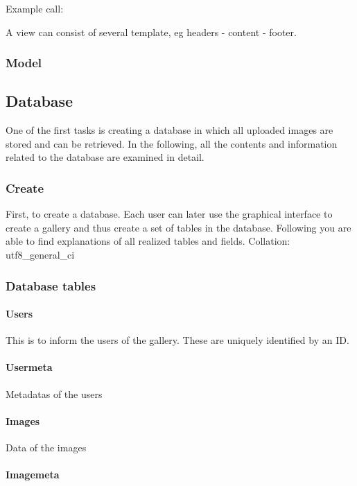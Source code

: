 \documentclass[a4paper,12pt,oneside]{article} %
\begin{document}
Example call:

A view can consist of several template, eg headers - content - footer.


\subsubsection*{Model}


\subsection{Database }

One of the first tasks is creating a database in which all uploaded
images are stored and can be retrieved. In the following, all the
contents and information related to the database are examined in detail.


\subsubsection{Create}

First, to create a database.  Each user can later use the graphical
interface to create a gallery and thus create a set of tables in the
database. Following you are able to find explanations of all realized
tables and fields. Collation: utf8\_general\_ci


\subsubsection{Database tables}


\paragraph*{Users}

This is to inform the users of the gallery. These are uniquely identified
by an ID.


\paragraph*{Usermeta}

Metadatas of the users


\paragraph*{Images}

Data of the images


\paragraph*{Imagemeta}
\end{document}
